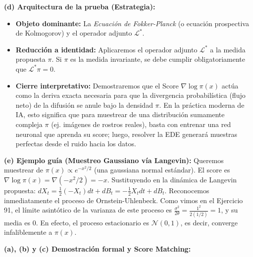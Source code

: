 \documentclass[11pt, letterpaper]{article}
\begin{document}
\vspace{5mm}

\begin{solucion}
    \textbf{(d) Arquitectura de la prueba (Estrategia):}
    \begin{itemize}
        \item[(i)] \textbf{Objeto dominante:} La \textit{Ecuación de Fokker-Planck} (o ecuación prospectiva de Kolmogorov) y el operador adjunto $\mathcal{L}^*$.
        \item[(ii)] \textbf{Reducción a identidad:} Aplicaremos el operador adjunto $\mathcal{L}^*$ a la medida propuesta $\pi$. Si $\pi$ es la medida invariante, se debe cumplir obligatoriamente que $\mathcal{L}^* \pi = 0$.
        \item[(iii)] \textbf{Cierre interpretativo:} Demostraremos que el Score $\nabla \log \pi(x)$ actúa como la deriva exacta necesaria para que la divergencia probabilística (flujo neto) de la difusión se anule bajo la densidad $\pi$. En la práctica moderna de IA, esto significa que para muestrear de una distribución sumamente compleja $\pi$ (ej. imágenes de rostros reales), basta con entrenar una red neuronal que aprenda su score; luego, resolver la EDE generará muestras perfectas desde el ruido hacia los datos.
    \end{itemize}

    \vspace{3mm}
    \textbf{(e) Ejemplo guía (Muestreo Gaussiano vía Langevin):}
    Queremos muestrear de $\pi(x) \propto e^{-x^2/2}$ (una gaussiana normal estándar).
    El score es $\nabla \log \pi(x) = \nabla (-x^2/2) = -x$.
    Sustituyendo en la dinámica de Langevin propuesta:
    $dX_t = \frac{1}{2}(-X_t) dt + dB_t = -\frac{1}{2} X_t dt + dB_t$.
    Reconocemos inmediatamente el proceso de Ornstein-Uhlenbeck. Como vimos en el Ejercicio 91, el límite asintótico de la varianza de este proceso es $\frac{\sigma^2}{2\theta} = \frac{1^2}{2(1/2)} = 1$, y su media es $0$. En efecto, el proceso estacionario es $\mathcal{N}(0,1)$, es decir, converge infaliblemente a $\pi(x)$.

    \textbf{(a), (b) y (c) Demostración formal y Score Matching:}


\end{solucion}
\end{document}
